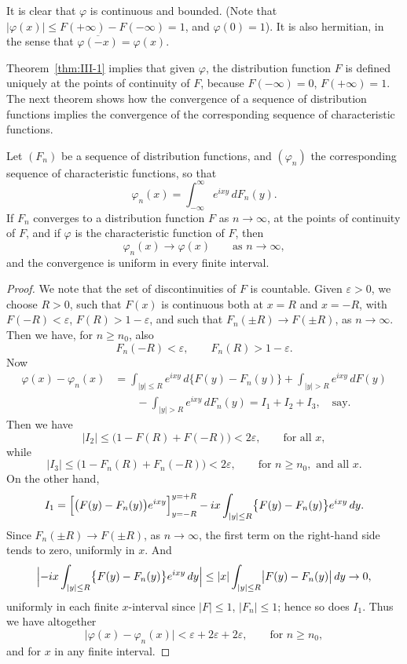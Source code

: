 It is clear that $\varphi$ is continuous and bounded. (Note that $|\varphi(x)|\le F(+\infty)-F(-\infty)=1$, and $\varphi(0)=1$). It is also hermitian, in the sense that $\overline{\varphi(-x)}=\varphi(x)$.

Theorem~\ref{thm:III-1} implies that given $\varphi$, the distribution function $F$ is defined uniquely at the points of continuity of $F$, because $F(-\infty)=0$, $F(+\infty)=1$. The next theorem shows how the convergence of a sequence of distribution functions implies the convergence of the corresponding sequence of characteristic functions.

\begin{theorem}\label{thm:III-3}
Let $(F_{n})$ be a sequence of distribution functions, and $(\varphi_{n})$ the corresponding sequence of characteristic functions, so that
\begin{equation}\tag{2.2}\label{eq:III-2.2}
\varphi_{n}(x)=\int_{-\infty}^{\infty}e^{ixy}\,dF_{n}(y).
\end{equation}
If $F_{n}$ converges to a distribution function $F$ as $n\to\infty$, at the points of continuity of $F$, and if $\varphi$ is the characteristic function of $F$, then
\begin{equation}\tag{2.3}\label{eq:III-2.3}
\varphi_{n}(x)\to\varphi(x)\qquad\text{as }n\to\infty,
\end{equation}
and the convergence is uniform in every finite interval.
\end{theorem}

\begin{proof}
We note that the set of discontinuities of $F$ is countable. Given $\varepsilon>0$, we choose $R>0$, such that $F(x)$ is continuous both at $x=R$ and $x=-R$, with $F(-R)<\varepsilon$, $F(R)>1-\varepsilon$, and such that $F_{n}(\pm R)\to F(\pm R)$, as $n\to\infty$. Then we have, for $n\ge n_{0}$, also
\[
F_{n}(-R)<\varepsilon,\qquad F_{n}(R)>1-\varepsilon.
\]
Now
\begin{align*}
\varphi(x)-\varphi_{n}(x)
&=\int_{|y|\le R}e^{ixy}\,d\bigl\{F(y)-F_{n}(y)\bigr\}+\int_{|y|>R}e^{ixy}\,dF(y)\\
&\qquad-\int_{|y|>R}e^{ixy}\,dF_{n}(y)=I_{1}+I_{2}+I_{3},\quad\text{say.}
\end{align*}
Then we have
\[
|I_{2}|\le\bigl(1-F(R)+F(-R)\bigr)<2\varepsilon,\qquad\text{for all }x,
\]
while
\[
|I_{3}|\le\bigl(1-F_{n}(R)+F_{n}(-R)\bigr)<2\varepsilon,\qquad\text{for }n\ge n_{0},\text{ and all }x.
\]
On the other hand,
\[
I_{1}=\Bigl[\bigl(F(y)-F_{n}(y)\bigr)e^{ixy}\Bigr]_{y=-R}^{y=+R}-ix\int_{|y|\le R}\bigl\{F(y)-F_{n}(y)\bigr\}e^{ixy}\,dy.
\]
Since $F_{n}(\pm R)\to F(\pm R)$, as $n\to\infty$, the first term on the right-hand side tends to zero, uniformly in $x$. And
\[
\Bigl|-ix\int_{|y|\le R}\bigl\{F(y)-F_{n}(y)\bigr\}e^{ixy}\,dy\Bigr|
\le|x|\int_{|y|\le R}\bigl|F(y)-F_{n}(y)\bigr|\,dy\to0,
\]
uniformly in each finite $x$-interval since $|F|\le1$, $|F_{n}|\le1$; hence so does $I_{1}$. Thus we have altogether
\[
\bigl|\varphi(x)-\varphi_{n}(x)\bigr|<\varepsilon+2\varepsilon+2\varepsilon,\qquad\text{for }n\ge n_{0},
\]
and for $x$ in any finite interval.
\end{proof}


